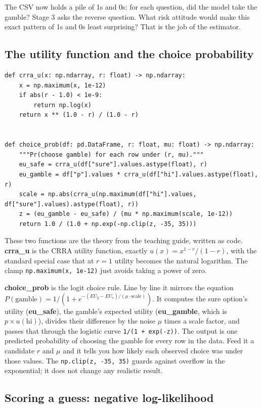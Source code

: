 \documentclass[11pt]{article}
\newcommand{\file}[1]{\textbf{\ttfamily #1}}
\begin{document}
The CSV now holds a pile of 1s and 0s: for each question, did the model take the gamble? Stage 3 asks
the reverse question. What risk attitude would make this exact pattern of 1s and 0s least surprising?
That is the job of the estimator.

\subsection{The utility function and the choice probability}

\begin{lstlisting}[style=py,firstnumber=33]
def crra_u(x: np.ndarray, r: float) -> np.ndarray:
    x = np.maximum(x, 1e-12)
    if abs(r - 1.0) < 1e-9:
        return np.log(x)
    return x ** (1.0 - r) / (1.0 - r)


def choice_prob(df: pd.DataFrame, r: float, mu: float) -> np.ndarray:
    """Pr(choose gamble) for each row under (r, mu)."""
    eu_safe = crra_u(df["sure"].values.astype(float), r)
    eu_gamble = df["p"].values * crra_u(df["hi"].values.astype(float), r)
    scale = np.abs(crra_u(np.maximum(df["hi"].values, df["sure"].values).astype(float), r))
    z = (eu_gamble - eu_safe) / (mu * np.maximum(scale, 1e-12))
    return 1.0 / (1.0 + np.exp(-np.clip(z, -35, 35)))
\end{lstlisting}

These two functions are the theory from the teaching guide, written as code. \file{crra\_u} is the
CRRA utility function, exactly $u(x) = x^{1-r}/(1-r)$, with the standard special case that at $r = 1$
utility becomes the natural logarithm. The clamp \verb|np.maximum(x, 1e-12)| just avoids taking a
power of zero.

\file{choice\_prob} is the logit choice rule. Line by line it mirrors the equation
$P(\text{gamble}) = 1/(1 + e^{-(EU_g - EU_s)/(\mu \cdot \text{scale})})$. It computes the sure option's
utility (\file{eu\_safe}), the gamble's expected utility (\file{eu\_gamble}, which is
$p \times u(\text{hi})$), divides their difference by the noise $\mu$ times a scale factor, and passes
that through the logistic curve \verb|1/(1 + exp(-z))|. The output is one predicted probability of
choosing the gamble for every row in the data. Feed it a candidate $r$ and $\mu$ and it tells you how
likely each observed choice was under those values. The \verb|np.clip(z, -35, 35)| guards against
overflow in the exponential; it does not change any realistic result.

\subsection{Scoring a guess: negative log-likelihood}
\end{document}
